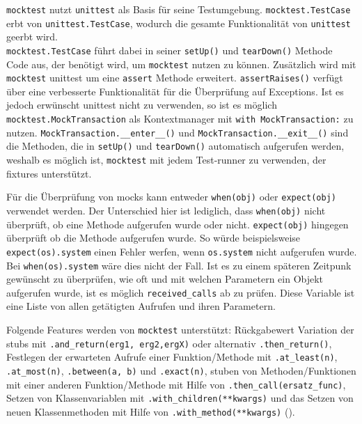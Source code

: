 \lstinline{mocktest} nutzt \lstinline{unittest} als Basis für seine
Testumgebung. \lstinline{mocktest.TestCase} erbt von
\lstinline{unittest.TestCase}, wodurch die gesamte Funktionalität von
\lstinline{unittest} geerbt wird.
\\  %
\lstinline{mocktest.TestCase} führt dabei in
seiner \lstinline{setUp()} und \lstinline{tearDown()} Methode Code aus, der
benötigt wird, um \lstinline{mocktest} nutzen zu können. Zusätzlich wird mit
\lstinline{mocktest} unittest um eine \lstinline{assert} Methode erweitert.
\lstinline{assertRaises()} verfügt über eine verbesserte Funktionalität für die
Überprüfung auf Exceptions. Ist es jedoch erwünscht unittest nicht zu verwenden,
so ist es möglich \lstinline{mocktest.MockTransaction} als Kontextmanager mit
\lstinline{with MockTransaction:} zu nutzen.
\lstinline{MockTransaction.__enter__()} und
\lstinline{MockTransaction.__exit__()} sind die Methoden, die in
\lstinline{setUp()} und \lstinline{tearDown()} automatisch aufgerufen werden,
weshalb es möglich ist, \lstinline{mocktest} mit jedem Test-runner zu verwenden,
der \Glspl{fixture} unterstützt.
\newline

Für die Überprüfung von \Glspl{mock} kann entweder \lstinline{when(obj)} oder
\lstinline{expect(obj)} verwendet werden. Der Unterschied hier ist lediglich,
dass \lstinline{when(obj)} nicht überprüft, ob eine Methode aufgerufen wurde 
oder nicht. \lstinline{expect(obj)} hingegen überprüft ob die Methode aufgerufen
wurde. So würde beispielsweise \lstinline{expect(os).system} einen Fehler
werfen, wenn \lstinline{os.system} nicht aufgerufen wurde. Bei
\lstinline{when(os).system} wäre dies nicht der Fall. Ist es zu einem späteren
Zeitpunk gewünscht zu überprüfen, wie oft und mit welchen Parametern ein Objekt
aufgerufen wurde, ist es möglich \lstinline{received_calls} ab zu prüfen. Diese
Variable ist eine Liste von allen getätigten Aufrufen und ihren Parametern.
\newline

Folgende Features werden von \lstinline{mocktest} unterstützt:
Rückgabewert Variation der \Glspl{stub} mit
\lstinline{.and_return(erg1, erg2,ergX)} oder alternativ
\lstinline{.then_return()}, Festlegen der erwarteten Aufrufe einer
Funktion/Methode mit \lstinline{.at_least(n)}, \lstinline{.at_most(n)},
\lstinline{.between(a, b)} und \lstinline{.exact(n)}, \Gls{stub}en von
Methoden/Funktionen mit einer anderen Funktion/Methode mit Hilfe von
\lstinline{.then_call(ersatz_func)}, Setzen von Klassenvariablen mit
\lstinline{.with_children(**kwargs)} und das Setzen von neuen Klassenmethoden
mit Hilfe von \lstinline{.with_method(**kwargs)} (\cite{mocktest:doc}).
\newline

